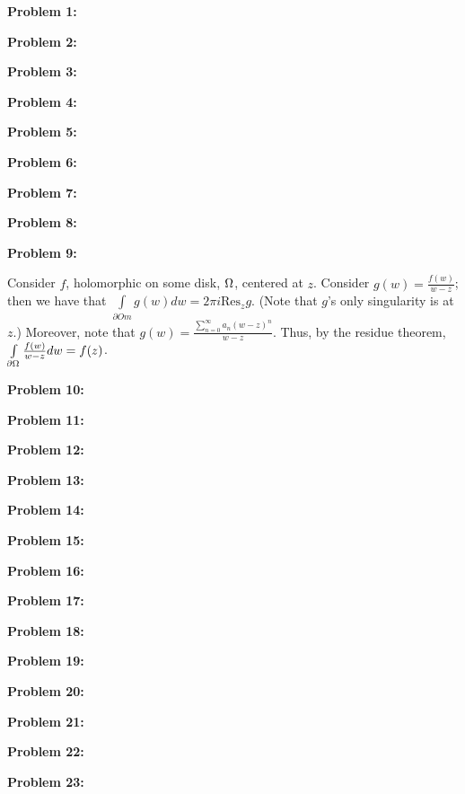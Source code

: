 \documentclass[a4paper,12pt]{article}
\begin{document}
{\bf Problem 1:}

\shunt

{\bf Problem 2:}

\shunt

{\bf Problem 3:}

\shunt

{\bf Problem 4:}

\shunt

{\bf Problem 5:}

\shunt

{\bf Problem 6:}

\shunt

{\bf Problem 7:}

\shunt

{\bf Problem 8:}

\shunt

{\bf Problem 9:}

Consider $f$, holomorphic on some disk, $\Omega$, centered at $z$. Consider $g(w) = \frac{f(w)}{w-z}$; then we have that $\int\limits_{\partial Om} g(w) dw= 2\pi i \text{Res}_z g$. (Note that $g$'s only singularity is at $z$.) Moreover, note that $g(w) = \frac{\sum\limits_{n=0}^\infty a_n(w-z)^n}{w-z}$. Thus, by the residue theorem, $\int\limits_{\partial \Omega} \frac{f(w)}{w-z} dw = f(z)$. 

\shunt

{\bf Problem 10:}

\shunt

{\bf Problem 11:}

\shunt

{\bf Problem 12:}

\shunt

{\bf Problem 13:}

\shunt

{\bf Problem 14:}

\shunt

{\bf Problem 15:}

\shunt

{\bf Problem 16:}

\shunt

{\bf Problem 17:}

\shunt

{\bf Problem 18:}

\shunt

{\bf Problem 19:}

\shunt

{\bf Problem 20:}

\shunt

{\bf Problem 21:}

\shunt

{\bf Problem 22:}

\shunt

{\bf Problem 23:}

\shunt
\end{document}
